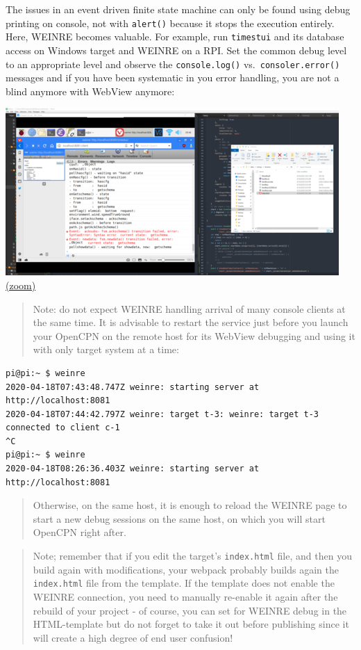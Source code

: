 \documentclass[11pt]{article}
\begin{document}
    The issues in an event driven finite state machine can only be found
using debug printing on console, not with \texttt{alert()} because it
stops the execution entirely. Here, WEINRE becomes valuable. For
example, run \texttt{timestui} and its database access on Windows target
and WEINRE on a RPI. Set the common debug level to an appropriate level
and observe the \texttt{console.log()} vs.~\texttt{consoler.error()}
messages and if you have been systematic in you error handling, you are
not a blind anymore with WebView anymore:

    \includegraphics{2020-04-18_weinre_dbg_async_events_and_fsm.png}
\href{img/2020-04-18_weinre_dbg_async_events_and_fsm.png}{(zoom)}

    \begin{quote}
Note: do not expect WEINRE handling arrival of many console clients at
the same time. It is advisable to restart the service just before you
launch your OpenCPN on the remote host for its WebView debugging and
using it with only target system at a time:
\end{quote}

\begin{verbatim}
pi@pi:~ $ weinre
2020-04-18T07:43:48.747Z weinre: starting server at http://localhost:8081
2020-04-18T07:44:42.797Z weinre: target t-3: weinre: target t-3 connected to client c-1
^C
pi@pi:~ $ weinre
2020-04-18T08:26:36.403Z weinre: starting server at http://localhost:8081
\end{verbatim}

\begin{quote}
Otherwise, on the same host, it is enough to reload the WEINRE page to
start a new debug sessions on the same host, on which you will start
OpenCPN right after.
\end{quote}

    \begin{quote}
Note; remember that if you edit the target's \texttt{index.html} file,
and then you build again with modifications, your webpack probably
builds again the \texttt{index.html} file from the template. If the
template does not enable the WEINRE connection, you need to manually
re-enable it again after the rebuild of your project - of course, you
can set for WEINRE debug in the HTML-template but do not forget to take
it out before publishing since it will create a high degree of end user
confusion!
\end{quote}
\end{document}
